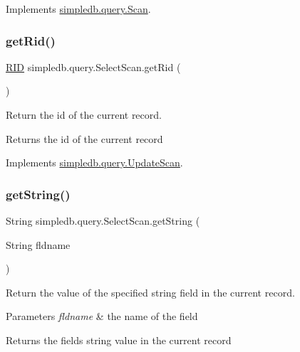 Implements \hyperlink{interfacesimpledb_1_1query_1_1Scan_a2e064555e16240115167b5d42d2b3d19}{simpledb.\+query.\+Scan}.

\mbox{\label{classsimpledb_1_1query_1_1SelectScan_aa7c6dfd2ab2cd1846c4fa84ee2c455d5}} 
\subsubsection{\texorpdfstring{get\+Rid()}{getRid()}}
{\footnotesize\ttfamily \hyperlink{classsimpledb_1_1record_1_1RID}{R\+ID} simpledb.\+query.\+Select\+Scan.\+get\+Rid (\begin{DoxyParamCaption}{ }\end{DoxyParamCaption})\hspace{0.3cm}{\ttfamily [inline]}}

Return the id of the current record. \begin{DoxyReturn}{Returns}
the id of the current record 
\end{DoxyReturn}


Implements \hyperlink{interfacesimpledb_1_1query_1_1UpdateScan_aa98f38fa6d4fc66862e0c739b577ce2d}{simpledb.\+query.\+Update\+Scan}.

\mbox{\label{classsimpledb_1_1query_1_1SelectScan_a82a4ef8dd0ba1287cfb3bd9f25d01bd2}} 
\subsubsection{\texorpdfstring{get\+String()}{getString()}}
{\footnotesize\ttfamily String simpledb.\+query.\+Select\+Scan.\+get\+String (\begin{DoxyParamCaption}\item[{String}]{fldname }\end{DoxyParamCaption})\hspace{0.3cm}{\ttfamily [inline]}}

Return the value of the specified string field in the current record. 
\begin{DoxyParams}{Parameters}
{\em fldname} & the name of the field \\
\hline
\end{DoxyParams}
\begin{DoxyReturn}{Returns}
the field\textquotesingle{}s string value in the current record 
\end{DoxyReturn}


